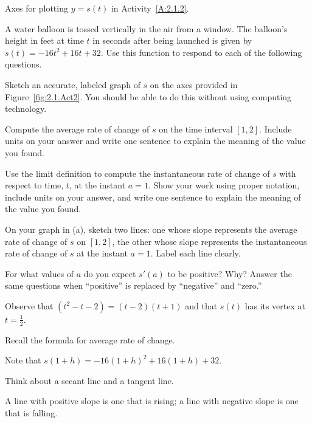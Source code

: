 \begin{marginfigure}[9cm]	
\caption{Axes for plotting $y = s(t)$ in Activity~\ref{A:2.1.2}.} \label{fig:2.1.Act2}
\end{marginfigure}

\begin{activity}  \label{A:2.1.2}
A water balloon is tossed vertically in the air from a window.  The balloon's height in feet at time $t$ in seconds after being launched is given by $s(t) = -16t^2 + 16t + 32$. Use this function to respond to each of the following questions.
\ba
	\item Sketch an accurate, labeled graph of $s$ on the axes provided in Figure~\ref{fig:2.1.Act2}.  You should be able to do this without using computing technology.
		
	\item Compute the average rate of change of $s$ on the time interval $[1,2]$.  Include units on your answer and write one sentence to explain the meaning of the value you found.  
	\item Use the limit definition to compute the instantaneous rate of change of $s$ with respect to time, $t$, at the instant $a = 1$.  Show your work using proper notation, include units on your answer, and write one sentence to explain the meaning of the value you found.
	\item On your graph in (a), sketch two lines:  one whose slope represents the average rate of change of $s$ on $[1,2]$, the other whose slope represents the instantaneous rate of change of $s$ at the instant $a=1$.  Label each line clearly.
	\item For what values of $a$ do you expect $s'(a)$ to be positive?  Why?  Answer the same questions when ``positive'' is replaced by ``negative'' and  ``zero.'' 
\ea
\end{activity}
\begin{smallhint}
\ba
	\item Observe that $(t^2 - t - 2) = (t-2)(t+1)$ and that $s(t)$ has its vertex at $t = \frac{1}{2}$.
	\item Recall the formula for average rate of change.
	\item Note that $s(1+h) = -16(1+h)^2 + 16(1+h) + 32$.
	\item Think about a secant line and a tangent line.
	\item A line with positive slope is one that is rising; a line with negative slope is one that is falling.
\ea
\end{smallhint}
